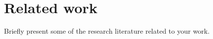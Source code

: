 \chapter{Related work}
\thispagestyle{fancy}
\label{c:relatedwork}

Briefly present some of the research literature related to your work.
